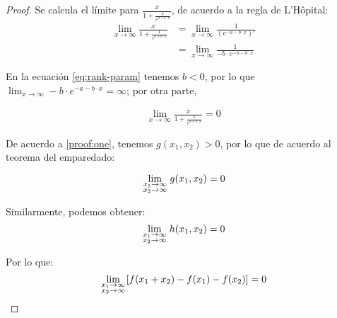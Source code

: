 \begin{proof}
Se calcula el límite para $\frac{x}{1+\frac{1}{e^{a+b\cdot x}}}$, de acuerdo a la regla de L'Hôpital:
\[
\begin{aligned}
\lim_{x \to \infty}\frac{x}{1+\frac{1}{e^{a+b\cdot x}}}&=\lim_{x \to \infty}\frac{1}{(e^{-a-b\cdot x})'}\\
&=\lim_{x \to \infty}\frac{1}{-b\cdot e^{-a-b\cdot x}}
\end{aligned}
\]

En la ecuación \ref{eq:rank-param} tenemos $b<0$, por lo que $\lim_{x \to \infty}-b\cdot e^{-a-b\cdot x}=\infty$; por otra parte,

\[
\begin{aligned}
\lim_{x \to \infty}\frac{x}{1+\frac{1}{e^{a+b\cdot x}}}=0
\end{aligned}
\]

De acuerdo a \ref{proof:one}, tenemos $g(x_1,x_2)>0$, por lo que de acuerdo al teorema del emparedado:

\[
\mathop {\lim }\limits_{\scriptstyle x_1 \to \infty  \hfill \atop  \scriptstyle x_2 \to \infty  \hfill}g(x_1,x_2)=0
\]

Similarmente, podemos obtener:
\[
\mathop {\lim }\limits_{\scriptstyle x_1 \to \infty  \hfill \atop  \scriptstyle x_2 \to \infty  \hfill}h(x_1,x_2)=0
\]

Por lo que:
\[
\mathop {\lim }\limits_{\scriptstyle x_1 \to \infty  \hfill \atop  \scriptstyle x_2 \to \infty  \hfill}[f(x_1+x_2)-f(x_1)-f(x_2)]=0
\]


\end{proof}